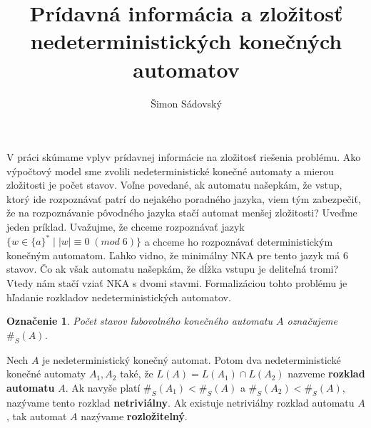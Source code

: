 \documentclass{svk_short_sk}
\newtheorem{notation}{Označenie}
\begin{document}
\title{Prídavná informácia a zložitosť nedeterministických konečných automatov}

\author{Šimon Sádovský
}




\maketitle

V práci skúmame vplyv prídavnej informácie na zložitosť riešenia problému. Ako
výpočtový model sme zvolili nedeterministické konečné automaty a mierou zložitosti je
počet stavov. Voľne povedané, ak automatu našepkám, že vstup, ktorý ide rozpoznávať patrí do nejakého poradného jazyka, viem tým zabezpečiť, že na rozpoznávanie pôvodného jazyka stačí automat menšej zložitosti? Uveďme jeden príklad. Uvažujme, že chceme rozpoznávať jazyk $ \lbrace w \in \lbrace a \rbrace^* \; | \; |w| \equiv 0 \; (mod \; 6) \rbrace $ a chceme ho rozpoznávať deterministickým konečným automatom. Ľahko vidno, že minimálny NKA pre tento jazyk má 6 stavov. Čo ak však automatu našepkám, že dĺžka vstupu je deliteľná tromi? Vtedy nám stačí vziať NKA s dvomi stavmi. Formalizáciou tohto problému je hľadanie rozkladov nedeterministických automatov.

\begin{notation}
Počet stavov ľubovolného konečného automatu $ A $ označujeme $ \#_S(A) $.
\end{notation}

\begin{definition}
Nech $ A $ je nedeterministický konečný automat. Potom dva nedeterministické konečné automaty $ A_1, A_2 $ také, že $ L(A)=L(A_1) \cap L(A_2) $ nazveme \textbf{rozklad automatu} $ A $. Ak navyše platí $ \#_S(A_1) < \#_S(A)$ a $ \#_S(A_2) < \#_S(A) $, nazývame tento rozklad \textbf{netriviálny}. Ak existuje netriviálny rozklad automatu $ A $, tak automat $ A $ nazývame \textbf{rozložitelný}.
\end{definition}
\end{document}

